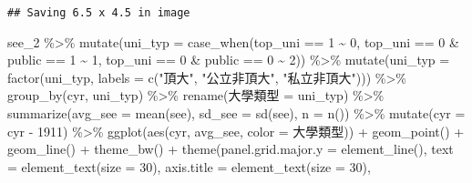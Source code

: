 \documentclass[
]{article}
\newenvironment{Shaded}{\begin{snugshade}}{\end{snugshade}}
\newcommand{\AttributeTok}[1]{\textcolor[rgb]{0.77,0.63,0.00}{#1}}
\newcommand{\DecValTok}[1]{\textcolor[rgb]{0.00,0.00,0.81}{#1}}
\newcommand{\FunctionTok}[1]{\textcolor[rgb]{0.00,0.00,0.00}{#1}}
\newcommand{\NormalTok}[1]{#1}
\newcommand{\OtherTok}[1]{\textcolor[rgb]{0.56,0.35,0.01}{#1}}
\newcommand{\SpecialCharTok}[1]{\textcolor[rgb]{0.00,0.00,0.00}{#1}}
\newcommand{\StringTok}[1]{\textcolor[rgb]{0.31,0.60,0.02}{#1}}
\begin{document}
\begin{verbatim}
## Saving 6.5 x 4.5 in image
\end{verbatim}

\begin{Shaded}
\begin{Highlighting}[]
\NormalTok{see\_2 }\SpecialCharTok{\%\textgreater{}\%}
  \FunctionTok{mutate}\NormalTok{(}\AttributeTok{uni\_typ =} \FunctionTok{case\_when}\NormalTok{(top\_uni }\SpecialCharTok{==} \DecValTok{1} \SpecialCharTok{\textasciitilde{}} \DecValTok{0}\NormalTok{,}
\NormalTok{                             top\_uni }\SpecialCharTok{==} \DecValTok{0} \SpecialCharTok{\&}\NormalTok{ public }\SpecialCharTok{==} \DecValTok{1} \SpecialCharTok{\textasciitilde{}} \DecValTok{1}\NormalTok{,}
\NormalTok{                             top\_uni }\SpecialCharTok{==} \DecValTok{0} \SpecialCharTok{\&}\NormalTok{ public }\SpecialCharTok{==} \DecValTok{0} \SpecialCharTok{\textasciitilde{}} \DecValTok{2}\NormalTok{)) }\SpecialCharTok{\%\textgreater{}\%}
  \FunctionTok{mutate}\NormalTok{(}\AttributeTok{uni\_typ =} \FunctionTok{factor}\NormalTok{(uni\_typ, }\AttributeTok{labels =} \FunctionTok{c}\NormalTok{(}\StringTok{"頂大"}\NormalTok{, }\StringTok{"公立非頂大"}\NormalTok{, }\StringTok{"私立非頂大"}\NormalTok{))) }\SpecialCharTok{\%\textgreater{}\%}
  \FunctionTok{group\_by}\NormalTok{(cyr, uni\_typ) }\SpecialCharTok{\%\textgreater{}\%}
  \FunctionTok{rename}\NormalTok{(大學類型 }\OtherTok{=}\NormalTok{ uni\_typ) }\SpecialCharTok{\%\textgreater{}\%}
  \FunctionTok{summarize}\NormalTok{(}\AttributeTok{avg\_see =} \FunctionTok{mean}\NormalTok{(see),}
            \AttributeTok{sd\_see =} \FunctionTok{sd}\NormalTok{(see),}
            \AttributeTok{n =} \FunctionTok{n}\NormalTok{()) }\SpecialCharTok{\%\textgreater{}\%}
  \FunctionTok{mutate}\NormalTok{(}\AttributeTok{cyr =}\NormalTok{ cyr }\SpecialCharTok{{-}} \DecValTok{1911}\NormalTok{) }\SpecialCharTok{\%\textgreater{}\%}
  \FunctionTok{ggplot}\NormalTok{(}\FunctionTok{aes}\NormalTok{(cyr, avg\_see, }\AttributeTok{color =}\NormalTok{ 大學類型)) }\SpecialCharTok{+}
  \FunctionTok{geom\_point}\NormalTok{() }\SpecialCharTok{+}
  \FunctionTok{geom\_line}\NormalTok{() }\SpecialCharTok{+}
  \FunctionTok{theme\_bw}\NormalTok{() }\SpecialCharTok{+}
  \FunctionTok{theme}\NormalTok{(}\AttributeTok{panel.grid.major.y =} \FunctionTok{element\_line}\NormalTok{(), }
        \AttributeTok{text =} \FunctionTok{element\_text}\NormalTok{(}\AttributeTok{size =} \DecValTok{30}\NormalTok{), }
        \AttributeTok{axis.title =} \FunctionTok{element\_text}\NormalTok{(}\AttributeTok{size =} \DecValTok{30}\NormalTok{), }

\end{Highlighting}
\end{Shaded}
\end{document}
